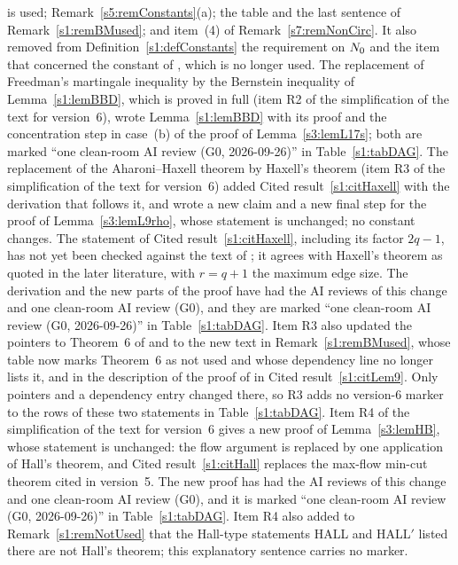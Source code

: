 \begin{remark}
\begin{enumerate}
is used; Remark~\ref{s5:remConstants}(a); the table and the
last sentence of Remark~\ref{s1:remBMused}; and item~(4) of
Remark~\ref{s7:remNonCirc}.
It also removed from Definition~\ref{s1:defConstants} the requirement on
$N_{0}$ and the item that concerned the constant of \cite[Theorem~2]{BM},
which is no longer used.
The replacement of Freedman's martingale inequality by the Bernstein
inequality of Lemma~\ref{s1:lemBBD}, which is proved in full (item R2 of the
simplification of the text for version~6), wrote Lemma~\ref{s1:lemBBD} with
its proof and the concentration step in case~(b) of the proof of
Lemma~\ref{s3:lemL17s}; both are marked ``one clean-room AI review (G0,
2026-09-26)'' in Table~\ref{s1:tabDAG}.
The replacement of the Aharoni--Haxell theorem \cite[Theorem~6]{BM} by
Haxell's theorem (item R3 of the simplification of the text for version~6)
added Cited result~\ref{s1:citHaxell} with the derivation that follows it,
and wrote a new claim and a new final step for the proof of
Lemma~\ref{s3:lemL9rho}, whose statement is unchanged; no constant changes.
The statement of Cited result~\ref{s1:citHaxell}, including its factor
$2q-1$, has not yet been checked against the text of \cite{Hax95}; it agrees
with Haxell's theorem as quoted in the later literature, with $r=q+1$ the
maximum edge size. The
derivation and the new parts of the proof have had the AI reviews of this
change and one clean-room AI review (G0), and they are marked ``one clean-room
AI review (G0, 2026-09-26)'' in Table~\ref{s1:tabDAG}. Item R3 also updated
the pointers to Theorem~6 of \cite{BM} and to the new text in
Remark~\ref{s1:remBMused}, whose table now marks Theorem~6 as not used and
whose dependency line no longer lists it, and in the description of the
proof of \cite[Lemma~9]{BM} in Cited result~\ref{s1:citLem9}. Only pointers
and a dependency entry changed there, so R3 adds no version-6
marker to the rows of these two statements in Table~\ref{s1:tabDAG}.
Item R4 of the simplification of the text for version~6 gives a new proof of
Lemma~\ref{s3:lemHB}, whose statement is unchanged: the flow argument is
replaced by one application of Hall's theorem, and Cited
result~\ref{s1:citHall} replaces the max-flow min-cut theorem cited in
version~5. The new proof has had the AI reviews of this change and one
clean-room AI review (G0), and it is marked ``one clean-room AI review (G0,
2026-09-26)'' in Table~\ref{s1:tabDAG}. Item R4 also added to
Remark~\ref{s1:remNotUsed} that the Hall-type statements HALL and HALL$'$
listed there are not Hall's theorem; this explanatory sentence carries no
marker.


\end{enumerate}
\end{remark}
